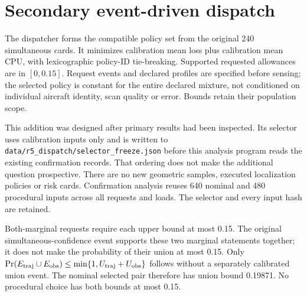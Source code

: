 \FloatBarrier
\section{Secondary event-driven dispatch}\label{supp:dispatch}
The dispatcher forms the compatible policy set from the original 240 simultaneous cards. It minimizes calibration mean loss plus calibration mean CPU, with lexicographic policy-ID tie-breaking. Supported requested allowances are in $[0,0.15]$. Request events and declared profiles are specified before sensing; the selected policy is constant for the entire declared mixture, not conditioned on individual aircraft identity, scan quality or error. Bounds retain their population scope.

This addition was designed after primary results had been inspected. Its selector uses calibration inputs only and is written to \texttt{data/r5\_dispatch/selector\_freeze.json} before this analysis program reads the existing confirmation records. That ordering does not make the additional question prospective. There are no new geometric samples, executed localization policies or risk cards. Confirmation analysis reuses 640 nominal and 480 procedural inputs across all requests and loads. The selector and every input hash are retained.

Both-marginal requests require each upper bound at most 0.15. The original simultaneous-confidence event supports these two marginal statements together; it does not make the probability of their union at most 0.15. Only $\Pr(E_{\rm traj}\cup E_{\rm obs})\le\min\{1,U_{\rm traj}+U_{\rm obs}\}$ follows without a separately calibrated union event. The nominal selected pair therefore has union bound 0.19871. No procedural choice has both bounds at most 0.15.

